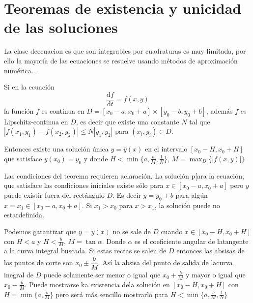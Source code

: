 \section{Teoremas de existencia y unicidad de las soluciones}

La clase deecuacion es que son integrables por cuadraturas es muy limitada, por ello la mayoría de las ecuaciones se resuelve usando métodos de aproximación numérica...


\begin{theorem}
Si en la ecuación
$$
\dfrac{\mathrm{d}f}{\mathrm{d}t}=f(x,y)
$$
la función $f$ es continua en $D=\left[x_0-a,x_0+a\right]\times\left[y_0-b,y_0+b\right]$, además $f$ es Lipschitz-continua en $D$, es decir que existe una constante $N$ tal que $|f(x_1,y_1)-f(x_2,y_2)|\leq N|y_1,y_2|$ para $(x_i,y_i)\in D$.

Entonces existe una solución única $y=\bar{y}(x)$ en el intervalo $\left[x_0-H,x_0+H\right]$ que satisface $y(x_0)=y_0$ y donde $H<\min\{a,\frac{b}{M},\frac{1}{N}\}$, $M=\max_{D}\{|f(x,y)|\} $
\end{theorem}


Las condiciones del teorema  requieren aclaración. La solución p[ara la ecuación, que satisface las condiciones iniciales  existe sólo para $x\in [x_0-a,x_0+a]$ pero $y$ puede existir fuera del rectángulo $D$. Es decir $y=y_0\pm b$ para algún $x=x_1\in[x_0-a,x_0+a]$. Si $x_1>x_0$ para $x>x_1$, la solución puede no estardefinida.

Podemos garantizar que $y=\bar{y}(x)$ no se sale de $D$ cuando $x\in[x_0-H,x_0+H]$ con $H<a$ y $H<\frac{b}{M}$, $M=\tan\alpha$. Donde $\alpha$ es el coeficiente angular de latangente a la curva integral buscada. Si estas rectas se salen de $D$ entonces las absisas de los puntos de corte son $x_0\pm\dfrac{b}{M}$. Así la absisa  del punto de salida de lacurva inegral de $D$ puede solamente ser menor o igual que $x_0+\frac{b}{M}$ y mayor o igual que $x_0-\frac{b}{M}$. Puede mostrarse ka existencia  dela solución en $[x_0-H,x_0+H]$ con $H=\min\{a,\frac{b}{M}\}$ pero será más sencillo mostrarlo para $H<\min\{a,\frac{b}{M},\frac{1}{N}\}$

\begin{figure}[H]
\centering
{}
    \caption{}
    \label{fig:my_label}
\end{figure}

